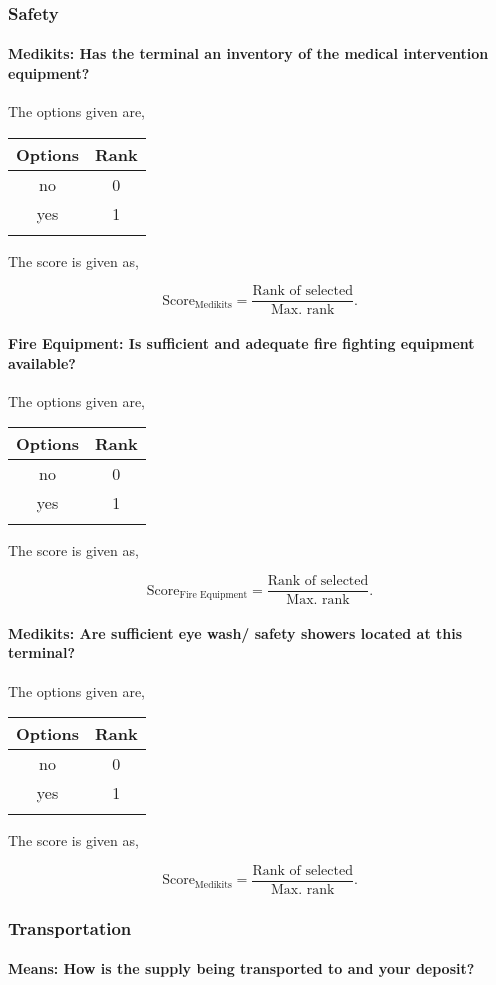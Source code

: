 \documentclass[oneside,twocolumn]{article}
\newcommand{\tsub}[2]{\text{#1}_{\text{#2}}}
\newcommand{\dsub}[2]{\dfrac{\text{#1}}{\text{#2}}}
\newcommand{\singsel}[1]
{
	\[
		\tsub{Score}{#1} = \dsub{Rank of selected}{Max. rank}.
	\]
}
\newenvironment{ttable}
{
\begin{center}
\begin{tabular}{c|c}
\hline
}
{
\\ \hline
\end{tabular}
\end{center}
}
\begin{document}
\subsubsection{Safety}

\paragraph{Medikits: Has the terminal an inventory of the medical intervention equipment?}

The options given are,
\begin{ttable}
Options & Rank \\ \hline
no & 0 \\
yes & 1 \\
\hline
\end{ttable}
The score is given as,
\singsel{Medikits}
\paragraph{Fire Equipment: Is sufficient and adequate fire fighting equipment available?}

The options given are,
\begin{ttable}
Options & Rank \\ \hline
no & 0 \\
yes & 1 \\
\hline
\end{ttable}
The score is given as,
\singsel{Fire Equipment}
\paragraph{Medikits: Are sufficient eye wash/ safety showers located at this terminal?}

The options given are,
\begin{ttable}
Options & Rank \\ \hline
no & 0 \\
yes & 1 \\
\hline
\end{ttable}
The score is given as,
\singsel{Medikits}
\subsubsection{Transportation}

\paragraph{Means: How is the supply being transported to and your deposit?}
\end{document}
